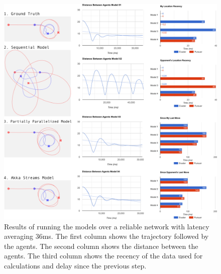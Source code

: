 \documentclass{article}
\begin{document}
\begin{figure}
	\centering
	\includegraphics[width=18.0cm]{charts-no-vpn}
	\caption{Results of running the models over a reliable network with latency averaging 36ms. The first column shows the trajectory followed by the agents. The second column shows the distance between the agents. The third column shows the recency of the data used for calculations and delay since the previous step.}\label{fig:charts-no-vpn}
\end{figure}
\end{document}
